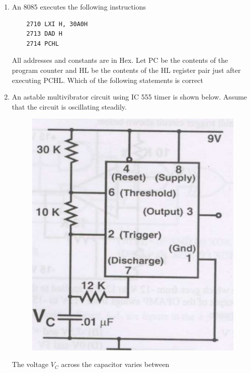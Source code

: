 \documentclass[a4paper, 11pt]{article}
\begin{document}
\begin{enumerate}
    \hfill{}
    
    \item An 8085 executes the following instructions
    \begin{lstlisting}
    2710 LXI H, 30A0H
    2713 DAD H
    2714 PCHL
    \end{lstlisting}
    All addresses and constants are in Hex. Let PC be the contents of the program counter and HL be the contents of the HL register pair just after executing PCHL. Which of the following statements is correct
    
    \begin{enumerate}
    \end{enumerate}
    
    \hfill{}
    
    \item An astable multivibrator circuit using IC 555 timer is shown below. Assume that the circuit is oscillating steadily.
    \begin{figure}[H]
        \centering
        \includegraphics[width=0.5\columnwidth]{q50}
        \caption*{}
        \label{fig:q50}
    \end{figure}
    The voltage $V_C$ across the capacitor varies between
    \begin{enumerate}
    \end{enumerate}
    

\end{enumerate}
\end{document}
